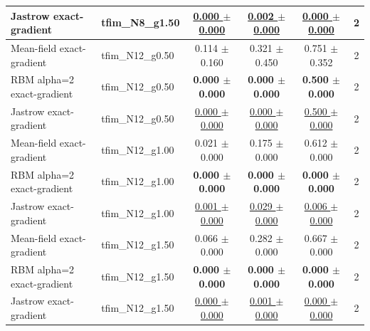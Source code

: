 \begin{tabular}{llcccc}
Jastrow exact-gradient & tfim\_N8\_g1.50 & \underline{0.000 $\pm$ 0.000} & \underline{0.002 $\pm$ 0.000} & \underline{0.000 $\pm$ 0.000} & 2 \\
\midrule
Mean-field exact-gradient & tfim\_N12\_g0.50 & 0.114 $\pm$ 0.160 & 0.321 $\pm$ 0.450 & 0.751 $\pm$ 0.352 & 2 \\
RBM alpha=2 exact-gradient & tfim\_N12\_g0.50 & \textbf{0.000 $\pm$ 0.000} & \textbf{0.000 $\pm$ 0.000} & \textbf{0.500 $\pm$ 0.000} & 2 \\
Jastrow exact-gradient & tfim\_N12\_g0.50 & \underline{0.000 $\pm$ 0.000} & \underline{0.000 $\pm$ 0.000} & \underline{0.500 $\pm$ 0.000} & 2 \\
\midrule
Mean-field exact-gradient & tfim\_N12\_g1.00 & 0.021 $\pm$ 0.000 & 0.175 $\pm$ 0.000 & 0.612 $\pm$ 0.000 & 2 \\
RBM alpha=2 exact-gradient & tfim\_N12\_g1.00 & \textbf{0.000 $\pm$ 0.000} & \textbf{0.000 $\pm$ 0.000} & \textbf{0.000 $\pm$ 0.000} & 2 \\
Jastrow exact-gradient & tfim\_N12\_g1.00 & \underline{0.001 $\pm$ 0.000} & \underline{0.029 $\pm$ 0.000} & \underline{0.006 $\pm$ 0.000} & 2 \\
\midrule
Mean-field exact-gradient & tfim\_N12\_g1.50 & 0.066 $\pm$ 0.000 & 0.282 $\pm$ 0.000 & 0.667 $\pm$ 0.000 & 2 \\
RBM alpha=2 exact-gradient & tfim\_N12\_g1.50 & \textbf{0.000 $\pm$ 0.000} & \textbf{0.000 $\pm$ 0.000} & \textbf{0.000 $\pm$ 0.000} & 2 \\
Jastrow exact-gradient & tfim\_N12\_g1.50 & \underline{0.000 $\pm$ 0.000} & \underline{0.001 $\pm$ 0.000} & \underline{0.000 $\pm$ 0.000} & 2 \\
\bottomrule
\end{tabular}
